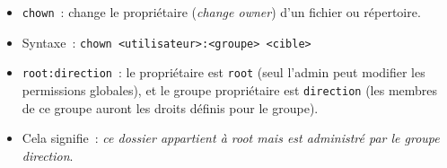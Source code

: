 \documentclass[12pt,a4paper]{article}
\begin{document}
\begin{explainbox}
\begin{itemize}[leftmargin=1.5em,topsep=2pt]
  \item \texttt{chown}~: change le propriétaire (\textit{change owner}) d'un fichier ou
    répertoire.
  \item Syntaxe~: \texttt{chown <utilisateur>:<groupe> <cible>}
  \item \texttt{root:direction}~: le propriétaire est \texttt{root} (seul l'admin peut
    modifier les permissions globales), et le groupe propriétaire est \texttt{direction}
    (les membres de ce groupe auront les droits définis pour le groupe).
  \item Cela signifie~: \textit{ce dossier appartient à root mais est administré par le
    groupe direction}.
\end{itemize}
\end{explainbox}
\end{document}
